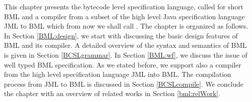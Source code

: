 
%

\newcommand{\code}{\textit{code}}
\newcommand{\indexComp}{\textit{index}}





This chapter presents the bytecode level specification language, called for short BML and a compiler from a
 subset of the high level Java specification language JML to BML which from now we shall call \JMLtoBML. 
The chapter is organized as follows.
In Section \ref{BML:design}, we start with discussing the basic design features of BML and its compiler. 
 A detailed overview of the syntax and semantics of BML is given in Section \ref{BCSLgrammar}.  
In Section \ref{BML:wf}, we discuss the issue of well typed BML specification. 
  As we stated before, we support also a compiler from the high level specification language JML into BML. The 
 compilation process from JML to BML is discussed in Section  \ref{BCSLcompile}.
 We conclude the chapter with an overview of related works in Section \ref{bml:relWork}. 




